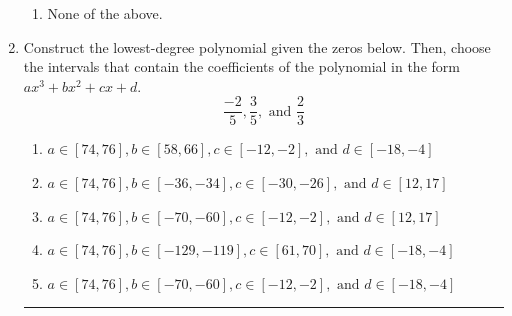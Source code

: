 \documentclass[14pt]{extbook}
\newcommand{\litem}[1]{\item#1\hspace*{-1cm}\rule{\textwidth}{0.4pt}}
\begin{document}
\begin{enumerate}
{\begin{enumerate}[label=\Alph*.]
\item None of the above.
\end{enumerate} }
\litem{
Construct the lowest-degree polynomial given the zeros below. Then, choose the intervals that contain the coefficients of the polynomial in the form $ax^3+bx^2+cx+d$.\[ \frac{-2}{5}, \frac{3}{5}, \text{ and } \frac{2}{3} \]\begin{enumerate}[label=\Alph*.]
\item \( a \in [74, 76], b \in [58, 66], c \in [-12, -2], \text{ and } d \in [-18, -4] \)
\item \( a \in [74, 76], b \in [-36, -34], c \in [-30, -26], \text{ and } d \in [12, 17] \)
\item \( a \in [74, 76], b \in [-70, -60], c \in [-12, -2], \text{ and } d \in [12, 17] \)
\item \( a \in [74, 76], b \in [-129, -119], c \in [61, 70], \text{ and } d \in [-18, -4] \)
\item \( a \in [74, 76], b \in [-70, -60], c \in [-12, -2], \text{ and } d \in [-18, -4] \)


\end{enumerate}}
\end{enumerate}
\end{document}
